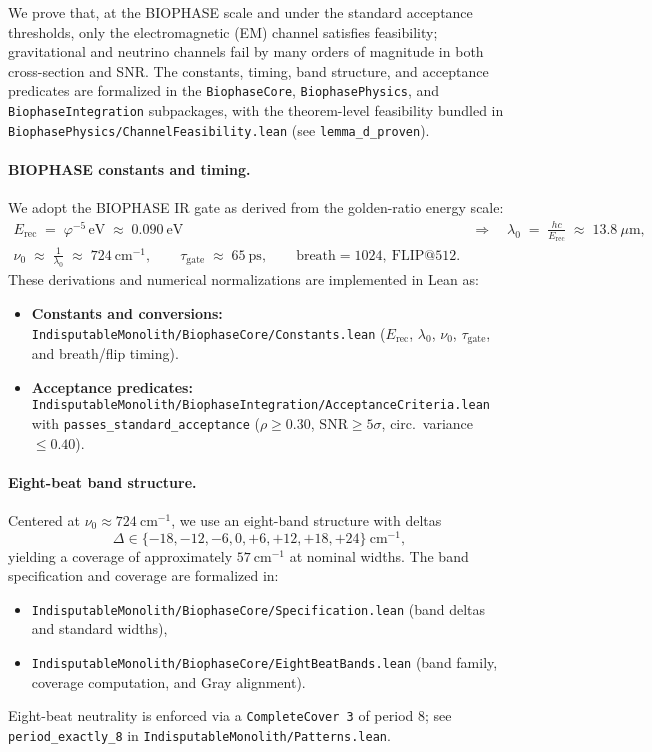 \documentclass[12pt,a4paper]{article}
\begin{document}
We prove that, at the BIOPHASE scale and under the standard acceptance thresholds, only the electromagnetic (EM) channel satisfies feasibility; gravitational and neutrino channels fail by many orders of magnitude in both cross-section and SNR. The constants, timing, band structure, and acceptance predicates are formalized in the \texttt{BiophaseCore}, \texttt{BiophasePhysics}, and \texttt{BiophaseIntegration} subpackages, with the theorem-level feasibility bundled in \texttt{BiophasePhysics/ChannelFeasibility.lean} (see \texttt{lemma\_d\_proven}).

\paragraph{BIOPHASE constants and timing.}
We adopt the BIOPHASE IR gate as derived from the golden-ratio energy scale:
\begin{align}
  E_{\mathrm{rec}} \;=\; \varphi^{-5}\,\mathrm{eV} \;\approx\; 0.090~\mathrm{eV}
  \quad&\Rightarrow\quad
  \lambda_{0} \;=\; \frac{hc}{E_{\mathrm{rec}}} \;\approx\; 13.8~\mu\mathrm{m},
  \\
  \nu_{0} \;\approx\; \frac{1}{\lambda_{0}} \;\approx\; 724~\mathrm{cm}^{-1},
  \qquad
  \tau_{\mathrm{gate}} \;\approx\; 65~\mathrm{ps}, 
  \qquad
  \text{breath}=1024,~\text{FLIP@512}.
\end{align}
These derivations and numerical normalizations are implemented in Lean as:
\begin{itemize}
  \item \textbf{Constants and conversions:} \texttt{IndisputableMonolith/BiophaseCore/Constants.lean} (\(E_{\mathrm{rec}}\), \(\lambda_0\), \(\nu_0\), \(\tau_{\mathrm{gate}}\), and breath/flip timing).
  \item \textbf{Acceptance predicates:} \texttt{IndisputableMonolith/BiophaseIntegration/AcceptanceCriteria.lean} with \texttt{passes\_standard\_acceptance} (\(\rho\ge 0.30\), \(\mathrm{SNR}\ge 5\sigma\), circ.\ variance \(\le 0.40\)).
\end{itemize}

\paragraph{Eight-beat band structure.}
Centered at \(\nu_0\approx 724~\mathrm{cm}^{-1}\), we use an eight-band structure with deltas
\[
  \Delta \in \{-18,-12,-6,0,+6,+12,+18,+24\}~\mathrm{cm}^{-1},
\]
yielding a coverage of approximately \(57~\mathrm{cm}^{-1}\) at nominal widths. The band specification and coverage are formalized in:
\begin{itemize}
  \item \texttt{IndisputableMonolith/BiophaseCore/Specification.lean} (band deltas and standard widths),
  \item \texttt{IndisputableMonolith/BiophaseCore/EightBeatBands.lean} (band family, coverage computation, and Gray alignment).
\end{itemize}
Eight-beat neutrality is enforced via a \texttt{CompleteCover 3} of period 8; see \texttt{period\_exactly\_8} in \texttt{IndisputableMonolith/Patterns.lean}.
\end{document}
